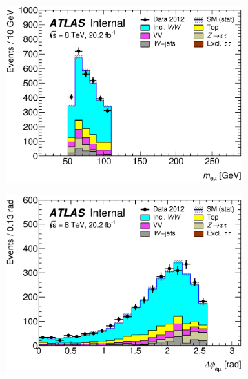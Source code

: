 \begin{figure}[!h]
\begin{subfigure}{0.5\textwidth}
   \includegraphics[width=\textwidth]{figures/emme-CutNjets-Mll-lin.eps}
\end{subfigure}
\begin{subfigure}{0.5\textwidth}
   \includegraphics[width=\textwidth]{figures/emme-CutNjets-DPhill-lin.eps}
\end{subfigure} 
\begin{subfigure}{0.5\textwidth}

\end{subfigure}
\end{figure}
